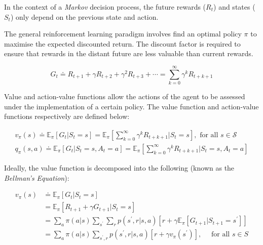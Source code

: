 \documentclass[12pt]{article}
\begin{document}
In the context of a \textit{Markov} decision process, the future rewards ($R_{t}$) and states ($S_{t}$) only depend on the previous state and action. 

The general reinforcement learning paradigm involves find an optimal policy $\pi$ to maximise the expected discounted return. The discount factor is required to ensure that rewards in the distant future are less valuable than current rewards.

$$
G _ { t } \doteq R _ { t + 1 } + \gamma R _ { t + 2 } + \gamma ^ { 2 } R _ { t + 3 } + \cdots = \sum _ { k = 0 } ^ { \infty } \gamma ^ { k } R _ { t + k + 1 }
$$

Value and action-value functions allow the actions of the agent to be assessed under the implementation of a certain policy. The value function and action-value functions respectively are defined below:

$$
\begin{aligned}
v _ { \pi } ( s ) \doteq \mathbb { E } _ { \pi } \left[ G _ { t } | S _ { t } = s \right] = \mathbb { E } _ { \pi } \left[ \sum _ { k = 0 } ^ { \infty } \gamma ^ { k } R _ { t + k + 1 } | S _ { t } = s \right] , \text { for all } s \in \mathcal{S} \\
q _ { \pi } ( s , a ) \doteq \mathbb { E } _ { \pi } \left[ G _ { t } | S _ { t } = s , A _ { t } = a \right] = \mathbb { E } _ { \pi } \left[ \sum _ { k = 0 } ^ { \infty } \gamma ^ { k } R _ { t + k + 1 } | S _ { t } = s , A _ { t } = a \right]
\end{aligned}
$$ 

Ideally, the value function is decomposed into the following (known as the \textit{Bellman's Equation}):

$$
\begin{aligned} v _ { \pi } ( s ) & \doteq \mathbb { E } _ { \pi } \left[ G _ { t } | S _ { t } = s \right] \\ & = \mathbb { E } _ { \pi } \left[ R _ { t + 1 } + \gamma G _ { t + 1 } | S _ { t } = s \right] \\ & = \sum _ { a } \pi ( a | s ) \sum _ { s ^ { \prime } } \sum _ { r } p \left( s ^ { \prime } , r | s , a \right) \left[ r + \gamma \mathbb { E } _ { \pi } \left[ G _ { t + 1 } | S _ { t + 1 } = s ^ { \prime } \right] \right] \\ & = \sum _ { a } \pi ( a | s ) \sum _ { s ^ { \prime } , r } p \left( s ^ { \prime } , r | s , a \right) \left[ r + \gamma v _ { \pi } \left( s ^ { \prime } \right) \right] , \quad \text { for all } s \in S \end{aligned}
$$
\end{document}
